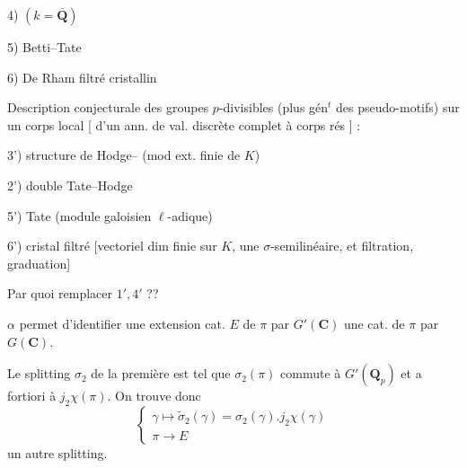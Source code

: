 4) 
 $(k=\overline{\mathbf Q})$

5)  Betti--Tate

6)  De Rham filtré cristallin

Description conjecturale des groupes $p$-divisibles 
(plus gén$^t$ des pseudo-motifs) sur un corps local
[ d’un ann. de val. discrète complet
à corps rés ] :

3') structure de Hodge--
(mod ext. finie de $K$)

2') double  Tate--Hodge

5') Tate (module galoisien $\ell$-adique)

6')  cristal filtré
[vectoriel  dim finie sur $K$, une 
$\sigma$-semilinéaire, et filtration, graduation]

Par quoi remplacer $1',4'$ ??

 $\alpha$ permet d'identifier une extension cat.  $E$ de $\pi$ par $G'(\mathbf C)$  une  cat. de $\pi$ par $G(\mathbf C)$.

Le splitting $\sigma_2$ de la première est tel que $\sigma_2(\pi)$ commute à $G'(\mathbf Q_p)$ et a fortiori à $j_2\chi(\pi)$. On trouve donc
\[
\left\{\begin{array}{l}
\gamma\longmapsto\widetilde\sigma_2(\gamma)=\sigma_2(\gamma).j_2\chi(\gamma)\\
\pi\longrightarrow E
\end{array}\right.
\]
un autre splitting.

